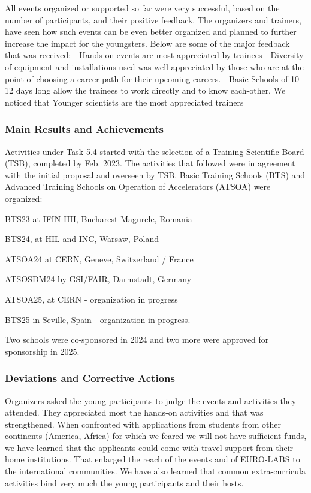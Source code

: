 All events organized or supported so far were very successful, based on the number of participants, and their positive feedback. The organizers and trainers, have seen how such events can be even better organized and planned to further increase the impact for the youngsters.
Below are some of the major feedback that was received:
- Hands-on events are most appreciated by trainees
- Diversity of equipment and installations used was well appreciated by those who are at the point     of choosing a career path for their upcoming careers.
- Basic Schools of 10-12 days long allow the trainees to work directly and to know each-other, 
We noticed that Younger scientists are the most appreciated trainers

\subsubsection*{Main Results and Achievements}

Activities under Task 5.4 started with the selection of a Training Scientific Board (TSB), completed by Feb. 2023. The activities that followed were in agreement with the initial proposal and overseen by TSB. Basic Training Schools (BTS) and Advanced Training Schools on Operation of Accelerators (ATSOA) were organized:

BTS23 at IFIN-HH, Bucharest-Magurele, Romania

BTS24, at HIL and INC, Warsaw, Poland

ATSOA24 at CERN, Geneve, Switzerland / France

ATSOSDM24 by GSI/FAIR, Darmstadt, Germany

ATSOA25, at CERN - organization in progress

BTS25 in Seville, Spain - organization in progress.

Two schools were co-sponsored in 2024 and two more were approved for sponsorship in 2025.
\subsubsection*{Deviations and Corrective Actions}

Organizers asked the young participants to judge the events and activities they attended. They appreciated most the hands-on activities and that was strengthened. When confronted with applications from students from other continents (America, Africa) for which we feared we will not have sufficient funds, we have learned that the applicants could come with travel support from their home institutions. That enlarged the reach of the events and of EURO-LABS to the international communities. We have also learned that common extra-curricula activities bind very much the young participants and their hosts.
